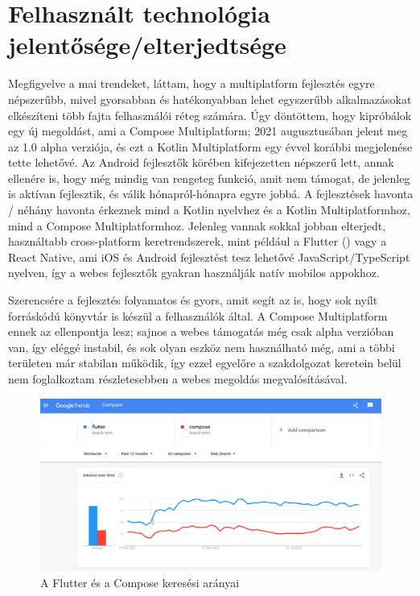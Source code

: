 \section{Felhasznált technológia jelentősége/elterjedtsége}
\label{sec:IntroductionTechnologies}

Megfigyelve a mai trendeket, láttam, hogy a multiplatform fejlesztés egyre népszerűbb, mivel gyorsabban és hatékonyabban lehet egyszerűbb alkalmazásokat elkészíteni több fajta felhasználói réteg számára.
Úgy döntöttem, hogy kipróbálok egy új megoldást, ami a Compose Multiplatform; 2021 augusztusában jelent meg az 1.0 alpha verziója, és ezt a Kotlin Multiplatform egy évvel korábbi megjelenése tette lehetővé.
Az Android fejlesztők körében kifejezetten népszerű lett, annak ellenére is, hogy még mindig van rengeteg funkció, amit nem támogat, de jelenleg is aktívan fejlesztik, és válik hónapról-hónapra egyre jobbá.
A fejlesztések havonta / néhány havonta érkeznek mind a Kotlin nyelvhez és a Kotlin Multiplatformhoz\cite{KotlinMultiplatformRelease}, mind a Compose Multiplatformhoz\cite{ComposeMultiplatformRelease}.
Jelenleg vannak sokkal jobban elterjedt, használtabb cross-platform keretrendszerek, mint például a Flutter () vagy a React Native, ami iOS és Android fejlesztést tesz lehetővé JavaScript/TypeScript nyelven, így a webes fejlesztők gyakran használják natív mobilos appokhoz.

Szerencsére a fejlesztés folyamatos és gyors, amit segít az is, hogy sok nyílt forráskódú könyvtár is készül a felhasználók által.\cite{KotlinMultiplatformStable}
A Compose Multiplatform ennek az ellenpontja lesz\cite{KotlinCrossPlatformFrameworks}; sajnos a webes támogatás még csak alpha verzióban van, így eléggé instabil, és sok olyan eszköz nem használható még, ami a többi területen már stabilan működik, így ezzel egyelőre a szakdolgozat keretein belül nem foglalkoztam részletesebben a webes megoldás megvalósításával.

\begin{figure}[!ht]
    \centering
    \includegraphics[width=150mm, keepaspectratio]{figures/flutter-vs-jetpack-compose-google-search-trends.png}
    \caption{A Flutter és a Compose keresési arányai \cite{FlutterVsCompose}}
    \label{fig:FlutterVsCompose}
\end{figure}

